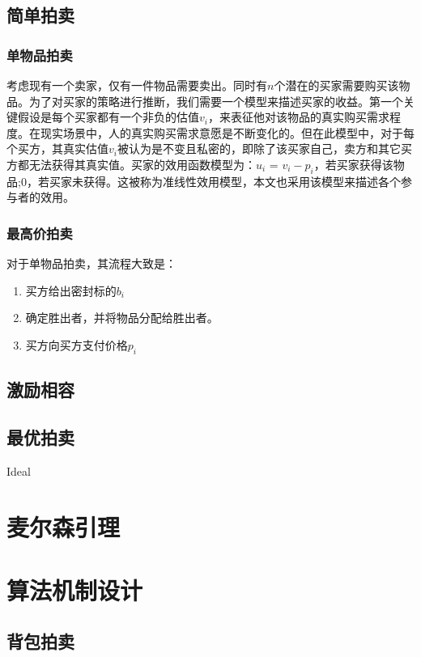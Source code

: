 \documentclass[promaster]{thesis-uestc}
\begin{document}
\subsection{简单拍卖}
\subsubsection{单物品拍卖}
考虑现有一个卖家，仅有一件物品需要卖出。同时有$n$个潜在的买家需要购买该物品。为了对买家的策略进行推断，我们需要一个模型来描述买家的收益。第一个关键假设是每个买家都有一个非负的估值$v_i$，来表征他对该物品的真实购买需求程度。在现实场景中，人的真实购买需求意愿是不断变化的。但在此模型中，对于每个买方，其真实估值$v_i$被认为是不变且私密的，即除了该买家自己，卖方和其它买方都无法获得其真实值。买家的效用函数模型为：$u_i$ = $v_i-p_i$，若买家获得该物品;$0$，若买家未获得。这被称为准线性效用模型，本文也采用该模型来描述各个参与者的效用。
\subsubsection{最高价拍卖}
对于单物品拍卖，其流程大致是：
\begin{enumerate}
    \item 买方给出密封标的$b_i$
    \item 确定胜出者，并将物品分配给胜出者。
    \item 买方向买方支付价格$p_i$
\end{enumerate} 

\subsection{激励相容}


\subsection{最优拍卖}
Ideal

\section{麦尔森引理}

\section{算法机制设计}

    \subsection{背包拍卖}
\end{document}
